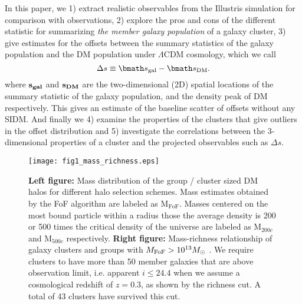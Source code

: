 In this paper, we 
1) extract realistic observables from the Illustris simulation for
comparison with observations, 2) explore the pros and cons of the different statistic for 
summarizing {\it the member galaxy population} of a galaxy cluster, 3)	
give estimates for the offsets between the summary statistics of the galaxy  
population and the DM population under $\Lambda$CDM cosmology, which we call 
\begin{equation}
	\Delta s \equiv \vec{s}_{\rm gal} - \vec{s}_{\rm DM}.
\end{equation}
where $\bf{s}_{gal}$ and $\bf{s}_{DM}$ are the two-dimensional (2D) spatial
locations of the summary statistic of the galaxy population, and the density
peak of DM respectively. This gives
an estimate of the baseline scatter of offsets without any SIDM. And finally we 
4) examine the properties of the clusters that give outliers in 
the offset distribution and 5) investigate the  
correlations between the 3-dimensional properties of a cluster and the projected 
observables such as $\Delta s$. 
\begin{figure*}
	\texttt{[image: fig1\_mass\_richness.eps]}
	\caption{ {\bf Left figure:} Mass distribution of the group / cluster sized 
		DM halos for different halo selection schemes. Mass estimates obtained by the
		FoF algorithm are labeled as  M$_{\text{FoF}}$.
		Masses centered on the most bound particle within a radius those the 
		average density is 200 or 500 times the critical density of the universe are 
		labeled as M$_{200c}$ and M$_{500c}$ respectively. 
		{\bf Right figure:} 
		Mass-richness relationship of galaxy clusters and groups with 
		$M_{\rm FoF} > 10^{13} M_{\odot}$ . We require clusters to have more than 50 member 
		galaxies that are above observation limit, i.e. apparent $i \leq 24.4$ when 
		we assume a cosmological redshift
of $z=0.3$, as shown by the richness cut. A total of 43 clusters have 
survived this cut. \label{fig:mass_richness}}
\end{figure*}

